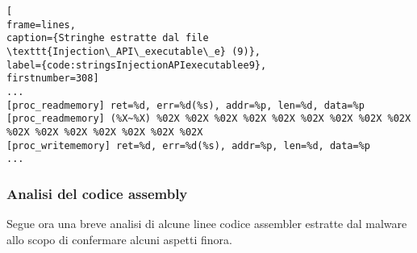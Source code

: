 \documentclass[10pt,a4paper, titlepage]{report}
\begin{document}
\begin{lstlisting}[
frame=lines, 
caption={Stringhe estratte dal file \texttt{Injection\_API\_executable\_e} (9)}, 
label={code:stringsInjectionAPIexecutablee9},
firstnumber=308]
...
[proc_readmemory] ret=%d, err=%d(%s), addr=%p, len=%d, data=%p
[proc_readmemory] (%X~%X) %02X %02X %02X %02X %02X %02X %02X %02X %02X %02X %02X %02X %02X %02X %02X %02X
[proc_writememory] ret=%d, err=%d(%s), addr=%p, len=%d, data=%p
...
\end{lstlisting}


	\newpage
\subsubsection{Analisi del codice assembly}
	
Segue ora una breve analisi di alcune linee codice assembler estratte dal malware allo scopo di confermare alcuni aspetti finora.
	
\end{document}
